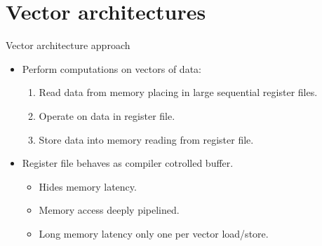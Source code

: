 \section{Vector architectures}

\begin{frame}[t]{Vector architecture approach}
\begin{itemize}
  \item Perform computations on vectors of data:
    \begin{enumerate}
      \item Read data from memory placing in large sequential register files.
      \item Operate on data in register file.
      \item Store data into memory reading from register file.
    \end{enumerate}

  \item Register file behaves as compiler cotrolled buffer.
    \begin{itemize}
      \item Hides memory latency.
      \item Memory access deeply pipelined.
      \item Long memory latency only one per vector load/store.
    \end{itemize}
\end{itemize}
\end{frame}

